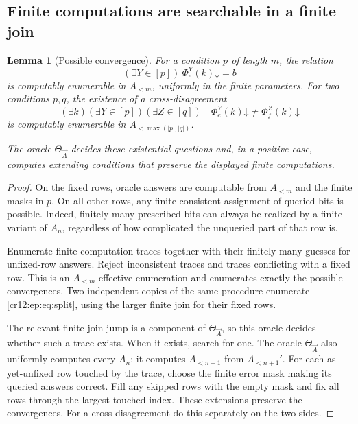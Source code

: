 \documentclass[11pt,letterpaper]{article}
\theoremstyle{plain}
\newtheorem{lemma}[theorem]{Lemma}
\theoremstyle{definition}
\theoremstyle{remark}
\numberwithin{equation}{section}
\newcommand{\Alt}[1]{A_{<#1}}            %
\begin{document}
\subsection{Finite computations are searchable in a finite join}
\begin{lemma}[Possible convergence]\label{cr12:ep:lem:possible}
For a condition $p$ of length $m$, the relation
\begin{equation}\label{cr12:ep:eq:possible}
 (\exists Y\in[p])\ \Phi_e^Y(k)\mathord\downarrow=b
\end{equation}
is computably enumerable in $\Alt m$, uniformly in the finite parameters. For two
conditions $p,q$, the existence of a cross-disagreement
\begin{equation}\label{cr12:ep:eq:split}
 (\exists k)(\exists Y\in[p])(\exists Z\in[q])\quad
 \Phi_e^Y(k)\mathord\downarrow\ne\Phi_f^Z(k)\mathord\downarrow
\end{equation}
is computably enumerable in $\Alt{\max(|p|,|q|)}$.

The oracle $\Theta_{\vec A}$ decides these existential questions and, in a positive
case, computes extending conditions that preserve the displayed finite
computations.
\end{lemma}
\begin{proof}
On the fixed rows, oracle answers are computable from $\Alt m$ and the finite masks
in $p$. On all other rows, any finite consistent assignment of queried bits is
possible. Indeed, finitely many prescribed bits can always be realized by a finite
variant of $A_n$, regardless of how complicated the unqueried part of that row is.

Enumerate finite computation traces together with their finitely many guesses for
unfixed-row answers. Reject inconsistent traces and traces conflicting with a fixed
row. This is an $\Alt m$-effective enumeration and enumerates exactly the possible
convergences. Two independent copies of the same procedure enumerate
\eqref{cr12:ep:eq:split}, using the larger finite join for their fixed rows.

The relevant finite-join jump is a component of $\Theta_{\vec A}$, so this oracle
decides whether such a trace exists. When it exists, search for one. The oracle
$\Theta_{\vec A}$ also uniformly computes every $A_n$: it computes $\Alt{n+1}$ from
$\Alt{n+1}'$. For each as-yet-unfixed row touched by the trace, choose the finite
error mask making its queried answers correct. Fill any skipped rows with the empty
mask and fix all rows through the largest touched index. These extensions preserve
the convergences. For a cross-disagreement do this separately on the two sides.
\end{proof}
\end{document}
